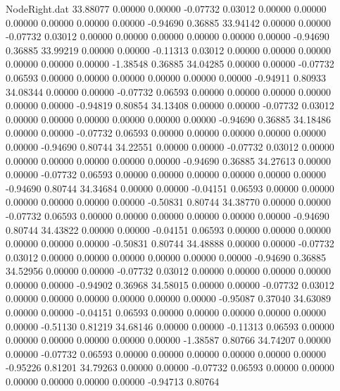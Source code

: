 \begin{filecontents}{NodeRight.dat}
  33.88077    0.00000    0.00000    -0.07732    0.03012    0.00000    0.00000    0.00000    0.00000    0.00000    0.00000   -0.94690    0.36885
  33.94142    0.00000    0.00000    -0.07732    0.03012    0.00000    0.00000    0.00000    0.00000    0.00000    0.00000   -0.94690    0.36885
  33.99219    0.00000    0.00000    -0.11313    0.03012    0.00000    0.00000    0.00000    0.00000    0.00000    0.00000   -1.38548    0.36885
  34.04285    0.00000    0.00000    -0.07732    0.06593    0.00000    0.00000    0.00000    0.00000    0.00000    0.00000   -0.94911    0.80933
  34.08344    0.00000    0.00000    -0.07732    0.06593    0.00000    0.00000    0.00000    0.00000    0.00000    0.00000   -0.94819    0.80854
  34.13408    0.00000    0.00000    -0.07732    0.03012    0.00000    0.00000    0.00000    0.00000    0.00000    0.00000   -0.94690    0.36885
  34.18486    0.00000    0.00000    -0.07732    0.06593    0.00000    0.00000    0.00000    0.00000    0.00000    0.00000   -0.94690    0.80744
  34.22551    0.00000    0.00000    -0.07732    0.03012    0.00000    0.00000    0.00000    0.00000    0.00000    0.00000   -0.94690    0.36885
  34.27613    0.00000    0.00000    -0.07732    0.06593    0.00000    0.00000    0.00000    0.00000    0.00000    0.00000   -0.94690    0.80744
  34.34684    0.00000    0.00000    -0.04151    0.06593    0.00000    0.00000    0.00000    0.00000    0.00000    0.00000   -0.50831    0.80744
  34.38770    0.00000    0.00000    -0.07732    0.06593    0.00000    0.00000    0.00000    0.00000    0.00000    0.00000   -0.94690    0.80744
  34.43822    0.00000    0.00000    -0.04151    0.06593    0.00000    0.00000    0.00000    0.00000    0.00000    0.00000   -0.50831    0.80744
  34.48888    0.00000    0.00000    -0.07732    0.03012    0.00000    0.00000    0.00000    0.00000    0.00000    0.00000   -0.94690    0.36885
  34.52956    0.00000    0.00000    -0.07732    0.03012    0.00000    0.00000    0.00000    0.00000    0.00000    0.00000   -0.94902    0.36968
  34.58015    0.00000    0.00000    -0.07732    0.03012    0.00000    0.00000    0.00000    0.00000    0.00000    0.00000   -0.95087    0.37040
  34.63089    0.00000    0.00000    -0.04151    0.06593    0.00000    0.00000    0.00000    0.00000    0.00000    0.00000   -0.51130    0.81219
  34.68146    0.00000    0.00000    -0.11313    0.06593    0.00000    0.00000    0.00000    0.00000    0.00000    0.00000   -1.38587    0.80766
  34.74207    0.00000    0.00000    -0.07732    0.06593    0.00000    0.00000    0.00000    0.00000    0.00000    0.00000   -0.95226    0.81201
  34.79263    0.00000    0.00000    -0.07732    0.06593    0.00000    0.00000    0.00000    0.00000    0.00000    0.00000   -0.94713    0.80764

\end{filecontents}
